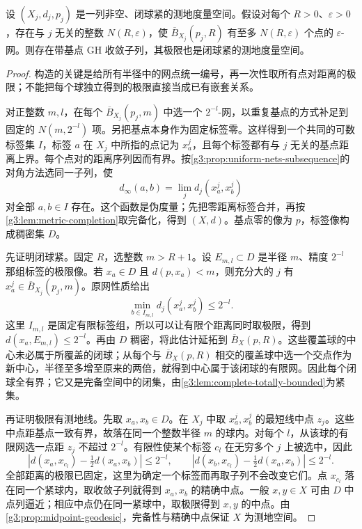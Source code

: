 \begin{theorem}\label{g3:thm:pointed-gh-precompactness}
	设 \((X_j,d_j,p_j)\) 是一列非空、闭球紧的测地度量空间。假设对每个 \(R>0\)、\(\varepsilon>0\)，存在与 \(j\) 无关的整数 \(N(R,\varepsilon)\)，使 \(\overline B_{X_j}(p_j,R)\) 有至多 \(N(R,\varepsilon)\) 个点的 \(\varepsilon\)-网。则存在带基点 GH 收敛子列，其极限也是闭球紧的测地度量空间。
\end{theorem}
\begin{proof}
	构造的关键是给所有半径中的网点统一编号，再一次性取所有点对距离的极限；不能把每个球独立得到的极限直接当成已有嵌套关系。

	对正整数 \(m,l\)，在每个 \(\overline B_{X_j}(p_j,m)\) 中选一个 \(2^{-l}\)-网，以重复基点的方式补足到固定的 \(N(m,2^{-l})\) 项。另把基点本身作为固定标签零。这样得到一个共同的可数标签集 \(I\)，标签 \(a\) 在 \(X_j\) 中所指的点记为 \(x_a^j\)，且每个标签都有与 \(j\) 无关的基点距离上界。每个点对的距离序列因而有界。按\cref{g3:prop:uniform-nets-subsequence}的对角方法选同一子列，使
	\[
		d_\infty(a,b)=\lim_j d_j(x_a^j,x_b^j)
	\]
	对全部 \(a,b\in I\) 存在。这个函数是伪度量；先把零距离标签合并，再按\cref{g3:lem:metric-completion}取完备化，得到 \((X,d)\)。基点零的像为 \(p\)，标签像构成稠密集 \(D\)。

	先证明闭球紧。固定 \(R\)，选整数 \(m>R+1\)。设 \(E_{m,l}\subset D\) 是半径 \(m\)、精度 \(2^{-l}\) 那组标签的极限像。若 \(x_a\in D\) 且 \(d(p,x_a)<m\)，则充分大的 \(j\) 有 \(x_a^j\in\overline B_{X_j}(p_j,m)\)。原网性质给出
	\[
		\min_{b\in I_{m,l}}d_j(x_a^j,x_b^j)\le2^{-l}.
	\]
	这里 \(I_{m,l}\) 是固定有限标签组，所以可以让有限个距离同时取极限，得到 \(d(x_a,E_{m,l})\le2^{-l}\)。再由 \(D\) 稠密，将此估计延拓到 \(\overline B_X(p,R)\)。这些覆盖球的中心未必属于所覆盖的闭球；从每个与 \(\overline B_X(p,R)\) 相交的覆盖球中选一个交点作为新中心，半径至多增至原来的两倍，就得到中心属于该闭球的有限网。因此每个闭球全有界；它又是完备空间中的闭集，由\cref{g3:lem:complete-totally-bounded}为紧集。

	再证明极限有测地线。先取 \(x_a,x_b\in D\)。在 \(X_j\) 中取 \(x_a^j,x_b^j\) 的最短线中点 \(z_j\)。这些中点距基点一致有界，故落在同一个整数半径 \(m\) 的球内。对每个 \(l\)，从该球的有限网选一点距 \(z_j\) 不超过 \(2^{-l}\)。有限性使某个标签 \(c_l\) 在无穷多个 \(j\) 上被选中，因此
	\[
		\left|d(x_a,x_{c_l})-\tfrac12d(x_a,x_b)\right|\le2^{-l},
		\qquad
		\left|d(x_b,x_{c_l})-\tfrac12d(x_a,x_b)\right|\le2^{-l}.
	\]
	全部距离的极限已固定，这里为确定一个标签而再取子列不会改变它们。点 \(x_{c_l}\) 落在同一个紧球内，取收敛子列就得到 \(x_a,x_b\) 的精确中点。一般 \(x,y\in X\) 可由 \(D\) 中点列逼近；相应中点仍在同一紧球中，取极限得到 \(x,y\) 的中点。由\cref{g3:prop:midpoint-geodesic}，完备性与精确中点保证 \(X\) 为测地空间。


\end{proof}
